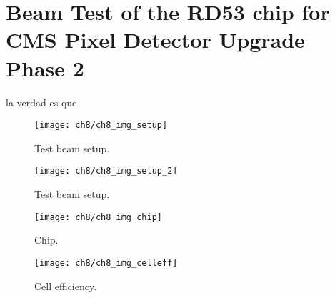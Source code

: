 \chapter{Beam Test of the RD53 chip for CMS Pixel Detector Upgrade Phase 2}\label{ch:testbeam}


la verdad es que

\begin{figure}[!h]
	\centering
	\texttt{[image: ch8/ch8\_img\_setup]}
	\caption[Test beam setup] {Test beam setup.}
	\label{ch8imgsetup}
\end{figure}

\begin{figure}[!h]
	\centering
	\texttt{[image: ch8/ch8\_img\_setup\_2]}
	\caption[Test beam setup] {Test beam setup.}
	\label{ch8imgsetup2}
\end{figure}

\begin{figure}[!h]
	\centering
	\texttt{[image: ch8/ch8\_img\_chip]}
	\caption[chip] {Chip.}
	\label{chip}
\end{figure}

\begin{figure}[!h]
	\centering
	\texttt{[image: ch8/ch8\_img\_celleff]}
	\caption[Cell efficiency] {Cell efficiency.}
	\label{celleff}
\end{figure}






